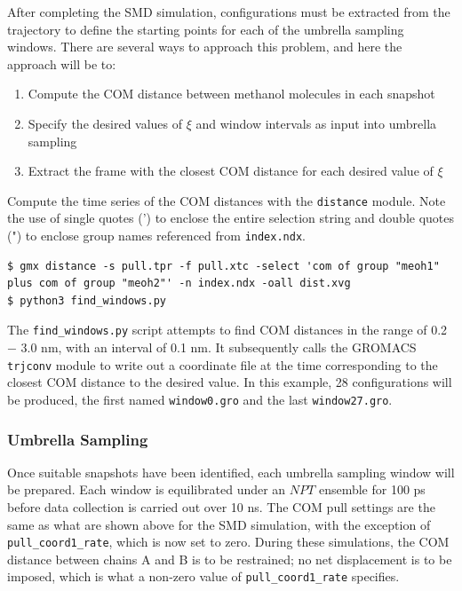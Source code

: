 \documentclass[9pt,tutorial,pubversion]{livecoms}
\begin{document}
After completing the SMD simulation, configurations must be extracted from the trajectory to define the starting points for each of the umbrella sampling windows. There are several ways to approach this problem, and here the approach will be to:

\begin{enumerate}
	\item Compute the COM distance between methanol molecules in each snapshot
	\item Specify the desired values of $\xi$ and window intervals as input into umbrella sampling
	\item Extract the frame with the closest COM distance for each desired value of $\xi$
\end{enumerate}

Compute the time series of the COM distances with the \texttt{distance} module. Note the use of single quotes (') to enclose the entire selection string and double quotes (") to enclose group names referenced from \texttt{index.ndx}.

\begin{lstlisting}
$ gmx distance -s pull.tpr -f pull.xtc -select 'com of group "meoh1" plus com of group "meoh2"' -n index.ndx -oall dist.xvg
$ python3 find_windows.py
\end{lstlisting}

The \texttt{find\_windows.py} script attempts to find COM distances in the range of 0.2 $-$ 3.0 nm, with an interval of 0.1 nm. It subsequently calls the GROMACS \texttt{trjconv} module to write out a coordinate file at the time corresponding to the closest COM distance to the desired value. In this example, 28 configurations will be produced, the first named \texttt{window0.gro} and the last \texttt{window27.gro}.

\subsubsection{Umbrella Sampling} \label{umbrella_us}

Once suitable snapshots have been identified, each umbrella sampling window will be prepared. Each window is equilibrated under an $NPT$ ensemble for 100 ps before data collection is carried out over 10 ns. The COM pull settings are the same as what are shown above for the SMD simulation, with the exception of \texttt{pull\_coord1\_rate}, which is now set to zero. During these simulations, the COM distance between chains A and B is to be restrained; no net displacement is to be imposed, which is what a non-zero value of \texttt{pull\_coord1\_rate} specifies.
\end{document}
